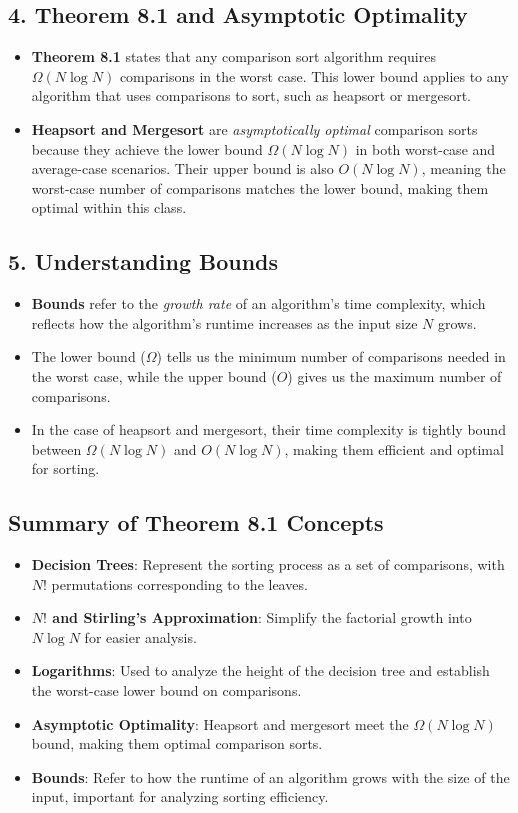 \documentclass{article}
\begin{document}
\subsection{4. Theorem 8.1 and Asymptotic Optimality}
\begin{itemize}
    \item \textbf{Theorem 8.1} states that any comparison sort algorithm requires \( \Omega(N \log N) \) comparisons in the worst case. This lower bound applies to any algorithm that uses comparisons to sort, such as heapsort or mergesort.
    \item \textbf{Heapsort and Mergesort} are \textit{asymptotically optimal} comparison sorts because they achieve the lower bound \( \Omega(N \log N) \) in both worst-case and average-case scenarios. Their upper bound is also \( O(N \log N) \), meaning the worst-case number of comparisons matches the lower bound, making them optimal within this class.
\end{itemize}

\subsection{5. Understanding Bounds}
\begin{itemize}
    \item \textbf{Bounds} refer to the \textit{growth rate} of an algorithm’s time complexity, which reflects how the algorithm’s runtime increases as the input size \( N \) grows.
    \item The lower bound (\( \Omega \)) tells us the minimum number of comparisons needed in the worst case, while the upper bound (\( O \)) gives us the maximum number of comparisons.
    \item In the case of heapsort and mergesort, their time complexity is tightly bound between \( \Omega(N \log N) \) and \( O(N \log N) \), making them efficient and optimal for sorting.
\end{itemize}

\subsection{Summary of Theorem 8.1 Concepts}
\begin{itemize}
    \item \textbf{Decision Trees}: Represent the sorting process as a set of comparisons, with \( N! \) permutations corresponding to the leaves.
    \item \textbf{\( N! \) and Stirling’s Approximation}: Simplify the factorial growth into \( N \log N \) for easier analysis.
    \item \textbf{Logarithms}: Used to analyze the height of the decision tree and establish the worst-case lower bound on comparisons.
    \item \textbf{Asymptotic Optimality}: Heapsort and mergesort meet the \( \Omega(N \log N) \) bound, making them optimal comparison sorts.
    \item \textbf{Bounds}: Refer to how the runtime of an algorithm grows with the size of the input, important for analyzing sorting efficiency.
\end{itemize}
\end{document}
